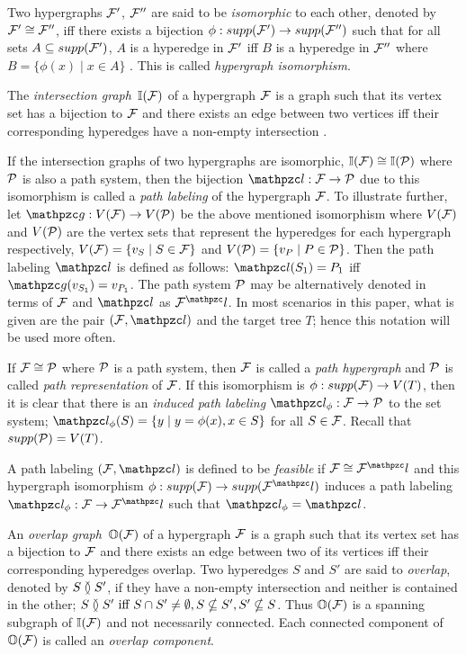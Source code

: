 \documentclass[MS]             %
              {iitmdiss_as}    %
\begin{document}
Two hypergraphs ${\cal F}'$, ${\cal F}''$ are said to be {\em isomorphic} to
each other, denoted by ${\cal F}' \cong {\cal F}''$, iff there exists a
bijection $\phi: supp({\cal F}') \rightarrow supp({\cal F}'')$ such that for all
sets $A \subseteq supp({\cal F}')$, $A$ is a hyperedge in ${\cal F}'$ iff $B$ is
a hyperedge in ${\cal F}''$ where $B = \{\phi(x) \mid x \in A\}$
\cite{kklv10}. This is called {\em hypergraph
  isomorphism}. 

The {\em intersection graph}\, $\mathbb I({\cal F})$ of a hypergraph ${\cal F}$ is a
graph such that its vertex set has a bijection to ${\cal F}$ and there
exists an edge between two vertices iff their corresponding hyperedges
have a non-empty intersection \cite{mcg04}.

If the intersection graphs of two hypergraphs are isomorphic,
$\mathbb I({\cal F}) \cong \mathbb I({\cal P})$ where ${\cal P}$ is also a path system, then the
bijection $\cl: \cF \rightarrow \cP$ due to this isomorphism is called
a {\em path labeling} of the hypergraph ${\cal F}$. To illustrate further,
let $\cg: V(\cF) \rightarrow V(\cP)$ be the above mentioned
isomorphism where $V({\cal F})$ and $V({\cal P})$ are the vertex sets that
represent the hyperedges for each hypergraph respectively, $V({\cal F}) =
\{ v_S \mid S \in {\cal F}\}$ and $V({\cal P}) = \{ v_P \mid P \in {\cal P}\}$. Then
the path labeling $\cl$ is defined as follows: $\cl(S_1) = P_1$ iff
$\cg (v_{S_1}) = v_{P_1}$. The path system ${\cal P}$ may be alternatively
denoted in terms of ${\cal F}$ and $\cl$ as $\cF^\cl$. In most scenarios in
this paper, what is given are the pair $(\cF, \cl)$ and the target
tree $T$; hence this notation will be used more often.

If ${\cal F} \cong {\cal P}$ where ${\cal P}$ is a path system, then ${\cal F}$
is called a {\em path hypergraph} and ${\cal P}$ is called {\em path
  representation} of ${\cal F}$. If this isomorphism is $\phi: supp({\cal F})
\rightarrow V(T)$, then it is clear that there is an {\em induced path
labeling} $\cl_\phi: \cF \rightarrow \cP$ to the set system;
$\cl_\phi(S) = \set{y \mid y = \phi(x), x \in S}$ for all $S \in {\cal F}$. Recall that
$supp({\cal P}) = V(T)$.


A path labeling $(\cF, \cl)$ is defined to be {\em
  feasible} if
$\cF \cong \cF^\cl$ and this hypergraph isomorphism $\phi: supp(\cF)
\rightarrow supp(\cF^\cl)$ induces a path labeling $\cl_\phi: \cF
\rightarrow \cF^\cl$ such that $\cl_\phi = \cl$. 

An {\em overlap graph}\, $\mathbb O({\cal F})$ of a hypergraph ${\cal F}$ is
a graph such that its vertex set has a bijection to ${\cal F}$ and there
exists an edge between two of its vertices iff their corresponding
hyperedges overlap. Two hyperedges $S$ and $S'$ are said to {\em
  overlap}, denoted by $S \between S'$, if they have a non-empty
intersection and neither is contained in the other; $S \between S'
\text{ iff } S \cap S' \ne \emptyset, S \nsubseteq S', S' \nsubseteq
S$. Thus $\mathbb O({\cal F})$ is a spanning subgraph of $\mathbb I({\cal F})$ and not
necessarily connected. Each connected component of $\mathbb O({\cal F})$ is
called an {\em overlap component}.
\end{document}
